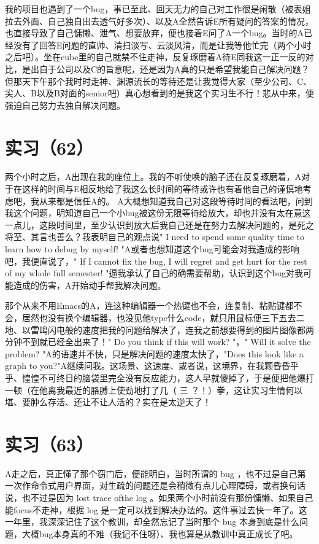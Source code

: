 \documentclass[12pt]{book}
\begin{document}
我的项目也遇到了一个bug，事已至此、回天无力的自己对工作很是闲散（被表姐拉去外面、自己独自出去透气好多次）、以及A全然告诉E所有疑问的答案的情况，也直接导致了自己慵懒、泄气、想要放弃，便也接着E问了A一个bug。当时的A已经没有了回答E问题的直帅、清扫淡写、云淡风清，而是让我等他忙完（两个小时之后吧）。坐在cube里的自己就禁不住走神，反复琢磨着A待E同我这一正一反的对比，是出自于公司以及C的旨意呢，还是因为A真的只是希望我能自己解决问题？但那天下午那个我时时走神、渊源流长的等待还是让我觉得大家（至少公司、C、尖人、B以及B对面的senior吧）真心想看到的是我这个实习生不行！悲从中来，便强迫自己努力去独自解决问题。


\section{实习（62）　}
\label{sec-5-65}

两个小时之后，A出现在我的座位上。我的不听使唤的脑子还在反复琢磨着，A对于在这样的时间与E相反地给了我这么长时间的等待或许也有着他自己的谨慎地考虑吧，我从来都是信任A的。 A大概想知道我自己对这段等待时间的看法吧，问到我这个问题，明知道自己一个小bug被这份无限等待给放大，却也并没有太在意这一点儿，这段时间里，至少认识到放大后我自己还是在努力去解决问题的，是死之将至、其言也善么？我表明自己的观点说" I need to spend some quality time to learn how to debug by myself! "A或者也想知道这个bug可能会对我造成的影响吧，我便直说了，" If I cannot fix the bug, I will regret and get hurt for the rest of my whole full semester! "逼我承认了自己的确需要帮助，认识到这个bug对我可能造成的伤害，A开始动手帮我解决问题。

那个从来不用Emacs的A，连这种编辑器一个热键也不会，连复制、粘贴键都不会，居然也没有换个编辑器，也没见他type什么code，就只用鼠标便三下五去二地、以雷鸣闪电般的速度把我的问题给解决了，连我之前想要得到的图片图像都两分钟不到就已经全出来了！" Do you think if this will work?  "，" Will it solve the problem? "A的语速并不快，只是解决问题的速度太快了，"Does this look like a graph to you?"A继续问我。这场景、这速度、或者说，这境界，在我颗昏昏乎乎、惶惶不可终日的脑袋里完全没有反应能力，这人早就傻掉了，于是便把他爆打一顿（在他离我最近的胳膊上使劲地打了几（ 三 ？！）拳，这让实习生情何以堪、要肿么存活、还让不让人活的？实在是太逆天了！


\section{实习（63）}
\label{sec-5-66}

A走之后，真正懂了那个窃门后，便能明白，当时所谓的 bug ，也不过是自己第一次作命令式用户界面，对生疏的问题还是会稍微有点儿心理障碍，或者换句话说，也不过是因为 lost trace ofthe log 。如果两个小时前没有那份慵懒、如果自己能focus不走神，根据 log 是一定可以找到解决办法的。这件事过去快一年了。这一年里，我深深记住了这个教训，却全然忘记了当时那个 bug 本身到底是什么问题，大概bug本身真的不难（我记不住呀）、我也算是从教训中真正成长了吧。
\end{document}
